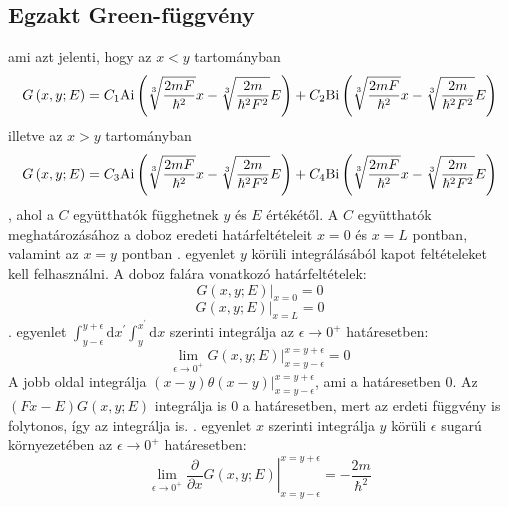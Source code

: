 \subsection{Egzakt Green-függvény}
ami azt jelenti, hogy az $x < y$ tartományban
\begin{equation}
    G\left(x, y; E\right) = C_1 \mathrm{Ai}\left(\sqrt[3]{\frac{2mF}{\hbar^2}}x - \sqrt[3]{\frac{2m}{\hbar^2F^2}}E\right) + C_2 \mathrm{Bi}\left(\sqrt[3]{\frac{2mF}{\hbar^2}}x - \sqrt[3]{\frac{2m}{\hbar^2F^2}}E\right)
    \label{green:xy}
\end{equation}
illetve az $x > y$ tartományban
\begin{equation}
    G\left(x, y; E\right) = C_3 \mathrm{Ai}\left(\sqrt[3]{\frac{2mF}{\hbar^2}}x - \sqrt[3]{\frac{2m}{\hbar^2F^2}}E\right) + C_4 \mathrm{Bi}\left(\sqrt[3]{\frac{2mF}{\hbar^2}}x - \sqrt[3]{\frac{2m}{\hbar^2F^2}}E\right)
    \label{green:yx}
\end{equation}
, ahol a $C$ együtthatók függhetnek $y$ és $E$ értékétől. A $C$ együtthatók meghatározásához a doboz eredeti határfeltételeit $x = 0$ és $x = L$ pontban, valamint az $x = y$ pontban . egyenlet $y$ körüli integrálásából kapot feltételeket kell felhasználni. A doboz falára vonatkozó határfeltételek:
\begin{equation}
	\left. G\left(x,y;E\right)\right\rvert_{x = 0} = 0
\end{equation}
\begin{equation}
	\left. G\left(x,y;E\right)\right\rvert_{x = L} = 0
\end{equation}
. egyenlet $\int_{y-\epsilon}^{y+\epsilon}\mathrm{d}x^\prime \int_{y}^{x^\prime} \mathrm{d}x$ szerinti integrálja az $\epsilon \to 0^+$ határesetben: 
\begin{equation}
	\lim_{\epsilon \to 0^+}\left.G\left(x,y;E \right)\right\rvert_{x = y - \epsilon}^{x = y + \epsilon} = 0
\end{equation}
A jobb oldal integrálja $\left. \left(x - y\right) \theta\left(x - y\right) \right\rvert_{x=y-\epsilon}^{x=y+\epsilon}$, ami a határesetben $0$. Az $\left(Fx - E\right)G\left(x,y;E\right)$ integrálja is $0$ a határesetben, mert az erdeti függvény is folytonos, így az integrálja is. . egyenlet $x$ szerinti integrálja $y$ körüli $\epsilon$ sugarú környezetében az $\epsilon \to 0^+$ határesetben:
\begin{equation}
	\lim_{\epsilon \to 0^+}\left.\frac{\partial}{\partial x}G\left(x,y;E \right)\right\rvert_{x = y - \epsilon}^{x = y + \epsilon} = -\frac{2m}{\hbar^2}
\end{equation}
